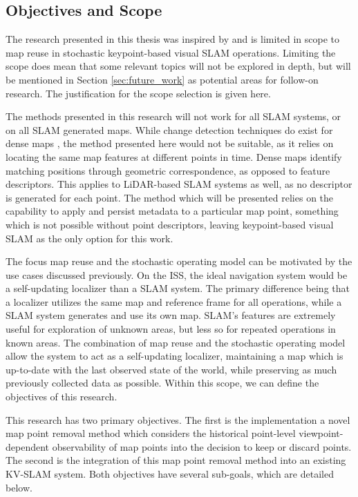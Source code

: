 \subsection{Objectives and Scope}
\label{objectives}

The research presented in this thesis was inspired by and is limited in scope to map reuse in stochastic keypoint-based visual SLAM operations. Limiting the scope does mean that some relevant topics will not be explored in depth, but will be mentioned in Section \ref{sec:future_work} as potential areas for follow-on research. The justification for the scope selection is given here.

The methods presented in this research will not work for all SLAM systems, or on all SLAM generated maps. While change detection techniques do exist for dense maps \cite{PLACEHOLDERa}, the method presented here would not be suitable, as it relies on locating the same map features at different points in time. Dense maps identify matching positions through geometric correspondence, as opposed to feature descriptors. This applies to LiDAR-based SLAM systems as well, as no descriptor is generated for each point. The method which will be presented relies on the capability to apply and persist metadata to a particular map point, something which is not possible without point descriptors, leaving keypoint-based visual SLAM as the only option for this work.

The focus map reuse and the stochastic operating model can be motivated by the use cases discussed previously. On the ISS, the ideal navigation system would be a self-updating localizer than a SLAM system. The primary difference being that a localizer utilizes the same map and reference frame for all operations, while a SLAM system generates and use its own map. SLAM's features are extremely useful for exploration of unknown areas, but less so for repeated operations in known areas. The combination of map reuse and the stochastic operating model allow the system to act as a self-updating localizer, maintaining a map which is up-to-date with the last observed state of the world, while preserving as much previously collected data as possible. Within this scope, we can define the objectives of this research.

This research has two primary objectives. The first is the implementation a novel map point removal method which considers the historical point-level viewpoint-dependent observability of map points into the decision to keep or discard points. The second is the integration of this map point removal method into an existing KV-SLAM system. Both objectives have several sub-goals, which are detailed below.

